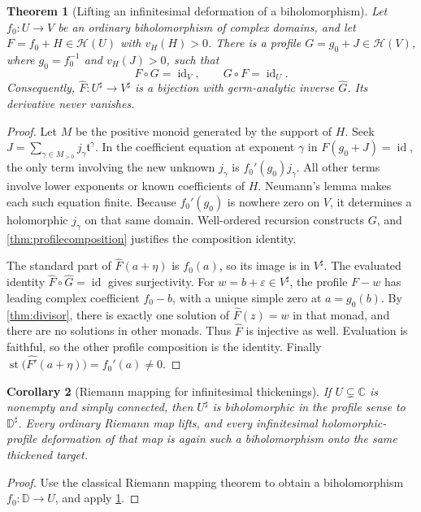 \documentclass[11pt,a4paper]{article}
\numberwithin{equation}{section}
\newtheorem{theorem}{Theorem}[section]
\newtheorem{corollary}[theorem]{Corollary}
\theoremstyle{definition}
\newcommand{\C}{\mathbb C}
\newcommand{\tmon}{\mathfrak t}
\newcommand{\HH}{\mathscr H}
\newcommand{\st}{\operatorname{st}}
\newcommand{\id}{\operatorname{id}}
\newcommand{\hhat}[1]{\widehat{#1}}
\newcommand{\vprof}{v_{\!H}}
\newcommand{\D}{\mathbb D}
\begin{document}
\begin{theorem}[Lifting an infinitesimal deformation of a biholomorphism]
\label{thm:biholo}
Let $f_0:U\to V$ be an ordinary biholomorphism of complex domains, and let
$F=f_0+H\in\HH(U)$ with $\vprof(H)>0$. There is a profile
$G=g_0+J\in\HH(V)$, where $g_0=f_0^{-1}$ and $\vprof(J)>0$, such that
\[
 F\circ G=\id_V,\qquad G\circ F=\id_U.
\]
Consequently, $\hhat F:U^\sharp\to V^\sharp$ is a bijection with germ-analytic
inverse $\hhat G$. Its derivative never vanishes.
\end{theorem}
\begin{proof}
Let $M$ be the positive monoid generated by the support of $H$. Seek
$J=\sum_{\gamma\in M_{>0}}j_\gamma\tmon^\gamma$.
In the coefficient equation at exponent $\gamma$ in $F(g_0+J)=\id$, the
only term involving the new unknown $j_\gamma$ is
$f_0'(g_0)j_\gamma$. All other terms involve lower exponents or known
coefficients of $H$. Neumann's lemma makes each such equation finite.
Because $f_0'(g_0)$ is nowhere zero on $V$, it determines a holomorphic
$j_\gamma$ on that same domain. Well-ordered recursion constructs $G$,
and \cref{thm:profilecomposition} justifies the composition identity.

The standard part of $\hhat F(a+\eta)$ is $f_0(a)$, so its image is in
$V^\sharp$. The evaluated identity $\hhat F\circ\hhat G=\id$ gives
surjectivity. For $w=b+\varepsilon\in V^\sharp$, the profile $F-w$ has leading
complex coefficient $f_0-b$, with a unique simple zero at $a=g_0(b)$.
By \cref{thm:divisor}, there is exactly one solution of $\hhat F(z)=w$ in
that monad, and there are no solutions in other monads. Thus $\hhat F$ is
injective as well. Evaluation is faithful, so the other profile composition
is the identity. Finally $\st\bigl(\hhat{F'}(a+\eta)\bigr)=f_0'(a)\neq0$.
\end{proof}

\begin{corollary}[Riemann mapping for infinitesimal thickenings]
\label{cor:riemann}
If $U\subsetneq\C$ is nonempty and simply connected, then $U^\sharp$ is
biholomorphic in the profile sense to $\D^\sharp$. Every ordinary Riemann map
lifts, and every infinitesimal holomorphic-profile deformation of that map
is again such a biholomorphism onto the same thickened target.
\end{corollary}
\begin{proof}
Use the classical Riemann mapping theorem to obtain a biholomorphism
$f_0:\D\to U$, and apply \cref{thm:biholo}.
\end{proof}
\end{document}
